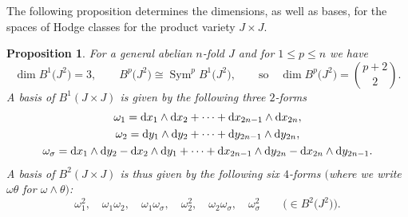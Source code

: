 \documentclass[10pt,a4paper]{amsart}
\numberwithin{equation}{section}
\newtheorem{Proposition}[Theorem]{Proposition}
 { \theoremstyle{definition}
\newtheorem{Definition}[Theorem]{Definition}
\newtheorem{Note}[Theorem]{Note}
\newtheorem{Example}[Theorem]{Example}
\newtheorem{Remark}[Theorem]{Remark} }
\begin{document}
The following proposition determines the dimensions, as well as bases, for the spaces of
Hodge classes for the product variety $J\times J$.

\begin{Proposition} \label{B2}
For a general abelian $n$-fold $J$ and for $1\leq p\leq n$ we have
\[
\dim B^1\big(J^2\big) = 3,\qquad B^p\big(J^2\big) \cong \operatorname{Sym}^pB^1\big(J^2\big),
\qquad \text{so}\quad\dim B^{p}\big(J^2\big) = \binom{p+2}{2}.
\]
A basis of $B^1(J\times J)$ is given by the following three $2$-forms
\begin{gather*}
\omega_1={\rm d} x_1\wedge{\rm d} x_2 + \dots + {\rm d} x_{2n-1}\wedge {\rm d} x_{2n},\\
\omega_2={\rm d} y_1\wedge{\rm d} y_2 + \dots + {\rm d} y_{2n-1}\wedge {\rm d} y_{2n},\\
\omega_\sigma={\rm d} x_1\wedge{\rm d} y_2 - {\rm d} x_2\wedge {\rm d} y_1 + \dots +
 {\rm d} x_{2n-1}\wedge{\rm d} y_{2n}-{\rm d} x_{2n}\wedge {\rm d} y_{2n-1}.
\end{gather*}
A basis of $B^2(J\times J)$ is thus given by the following six $4$-forms
$($where we write $\omega\theta$ for $\omega\wedge\theta)$:
\[
\omega_1^2, \quad\omega_1\omega_2, \quad
\omega_1\omega_\sigma,\quad
\omega_2^2,\quad
\omega_2\omega_\sigma,\quad \omega_\sigma^2\qquad
\big(\!\!\in B^2\big(J^2\big)\big).
\]
\end{Proposition}
\end{document}
